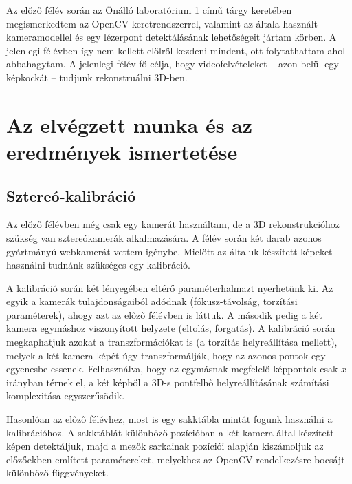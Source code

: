 \documentclass[a4paper,oneside]{article}
\begin{document}
Az előző félév során az Önálló laboratórium 1 című tárgy keretében megismerkedtem az OpenCV keretrendszerrel, valamint az általa használt kameramodellel és egy lézerpont detektálásának lehetőségeit jártam körben. A jelenlegi félévben így nem kellett elölről kezdeni mindent, ott folytathattam ahol abbahagytam. A jelenlegi félév fő célja, hogy videofelvételeket -- azon belül egy képkockát -- tudjunk rekonstruálni 3D-ben.

\newpage
\section{Az elvégzett munka és az eredmények ismertetése}
\label{sec:az-elvegzett-munka}

\subsection{Sztereó-kalibráció}
\label{sec:sztereo-kalibracio}

Az előző félévben még csak egy kamerát használtam, de a 3D rekonstrukcióhoz szükség van sztereókamerák alkalmazására. A félév során két darab azonos gyártmányú webkamerát vettem igénybe. Mielőtt az általuk készített képeket használni tudnánk szükséges egy kalibráció.

A kalibráció során két lényegében eltérő paraméterhalmazt nyerhetünk ki. Az egyik a kamerák tulajdonságaiból adódnak (fókusz-távolság, torzítási paraméterek), ahogy azt az előző félévben is láttuk. A második pedig a két kamera egymáshoz viszonyított helyzete (eltolás, forgatás). A kalibráció során megkaphatjuk azokat a transzformációkat is (a torzítás helyreállítása mellett), melyek a két kamera képét úgy transzformálják, hogy az azonos pontok egy egyenesbe essenek. Felhasználva, hogy az egymásnak megfelelő képpontok csak $x$ irányban térnek el, a két képből a 3D-s pontfelhő helyreállításának számítási komplexitása egyszerűsödik.

Hasonlóan az előző félévhez, most is egy sakktábla mintát fogunk használni a kalibrációhoz. A sakktáblát különböző pozícióban a két kamera által készített képen detektáljuk, majd a mezők sarkainak pozíciói alapján kiszámoljuk az előzőekben említett paramétereket, melyekhez az OpenCV rendelkezésre bocsájt különböző függvényeket.
\end{document}
